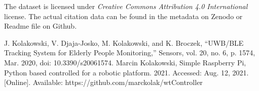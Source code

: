 \documentclass[conference]{IEEEtran}
\begin{document}
The dataset is licensed under \textit{Creative Commons Attribution 4.0 International} license. The actual citation data can be found in the metadata on Zenodo or Readme file on Github.




\begin{thebibliography}{00} 
 J. Kolakowski, V. Djaja-Josko, M. Kolakowski, and K. Broczek, “UWB/BLE Tracking System for Elderly People Monitoring,” Sensors, vol. 20, no. 6, p. 1574, Mar. 2020, doi: 10.3390/s20061574.
 Marcin Kolakowski, Simple Raspberry Pi, Python based controlled for a robotic platform. 2021. Accessed: Aug. 12, 2021. [Online]. Available: https://github.com/marckolak/wtController


\end{thebibliography}
\vspace{12pt}
\color{red}
\end{document}
